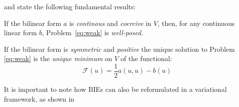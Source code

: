 and state the following fundamental results:
\begin{lemma}
  If the bilinear form $a$ is \emph{continous} and \emph{coercive}
  in $V$, then, for any continuous linear form $b$, Problem~\eqref{eq:weak} is
  \emph{well-posed}.
\end{lemma}
\begin{corollary}
  If the bilinear form is \emph{symmetric} and \emph{positive}
  the unique solution to Problem \eqref{eq:weak} is
  the \emph{unique minimum} on $V$ of the functional:
  \[
  \mathcal{F}(u) = \frac{1}{2}a(u, u) - b(u)
  \]
\end{corollary}

It is important to note how \glspl{BIE} can also be reformulated in a
variational framework, as shown in 

